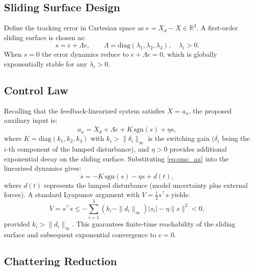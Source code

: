 \documentclass[11pt,a4paper]{article}
\begin{document}
\subsection{Sliding Surface Design}

Define the tracking error in Cartesian space as $e = X_d - X \in \mathbb{R}^3$.
A first-order sliding surface is chosen as:
\begin{equation}
  s = \dot{e} + \Lambda e, \qquad \Lambda = \mathrm{diag}(\lambda_1, \lambda_2, \lambda_3),
  \quad \lambda_i > 0.
  \label{eq:sliding_surface}
\end{equation}
When $s = 0$ the error dynamics reduce to $\dot{e} + \Lambda e = 0$, which is
globally exponentially stable for any $\lambda_i > 0$.

\subsection{Control Law}

Recalling that the feedback-linearized system satisfies $\ddot{X} = a_x$, the
proposed auxiliary input is:
\begin{equation}
  a_x = \ddot{X}_d + \Lambda\dot{e} + K\,\mathrm{sgn}(s) + \eta s,
  \label{eq:smc_ax}
\end{equation}
where $K = \mathrm{diag}(k_1, k_2, k_3)$ with $k_i > \|\delta_i\|_\infty$ is
the switching gain ($\delta_i$ being the $i$-th component of the lumped
disturbance), and $\eta > 0$ provides additional exponential decay on the
sliding surface. Substituting \eqref{eq:smc_ax} into the linearised dynamics
gives:
\begin{equation}
  \dot{s} = -K\,\mathrm{sgn}(s) - \eta s + d(t),
  \label{eq:sdot}
\end{equation}
where $d(t)$ represents the lumped disturbance (model uncertainty plus external
forces). A standard Lyapunov argument with $V = \tfrac{1}{2}s^\top s$ yields:
\begin{equation}
  \dot{V} = s^\top\dot{s}
          \leq -\sum_{i=1}^{3}(k_i - \|d_i\|_\infty)|s_i| - \eta\|s\|^2 < 0,
  \label{eq:lyapunov}
\end{equation}
provided $k_i > \|d_i\|_\infty$. This guarantees finite-time reachability of
the sliding surface and subsequent exponential convergence to $e = 0$.

\subsection{Chattering Reduction}
\end{document}
